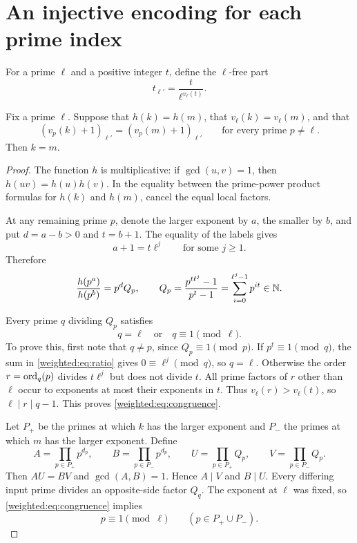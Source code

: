 \section{An injective encoding for each prime index}
For a prime $\ell$ and a positive integer $t$, define the $\ell$-free part
\[
t_{\ell'}=\frac{t}{\ell^{v_\ell(t)}}.
\]

\begin{lemma}\label{weighted:lem:encoding}
Fix a prime $\ell$. Suppose that $h(k)=h(m)$, that $v_\ell(k)=v_\ell(m)$, and that
\[
(v_p(k)+1)_{\ell'}=(v_p(m)+1)_{\ell'}
\qquad\text{for every prime }p\ne\ell.
\]
Then $k=m$.
\end{lemma}

\begin{proof}
The function $h$ is multiplicative: if $\gcd(u,v)=1$, then $h(uv)=h(u)h(v)$. In the equality between the prime-power product formulas for $h(k)$ and $h(m)$, cancel the equal local factors.

At any remaining prime $p$, denote the larger exponent by $a$, the smaller by $b$, and put $d=a-b>0$ and $t=b+1$. The equality of the labels gives
\[
a+1=t\ell^j\qquad\text{for some }j\ge1.
\]
Therefore
\begin{equation}\label{weighted:eq:ratio}
\frac{h(p^a)}{h(p^b)}=p^dQ_p,
\qquad Q_p=\frac{p^{t\ell^j}-1}{p^t-1}
=\sum_{i=0}^{\ell^j-1}p^{it}\in\mathbb N.
\end{equation}

Every prime $q$ dividing $Q_p$ satisfies
\begin{equation}\label{weighted:eq:congruence}
q=\ell\quad\text{or}\quad q\equiv1\pmod\ell.
\end{equation}
To prove this, first note that $q\ne p$, since $Q_p\equiv1\pmod p$. If $p^t\equiv1\pmod q$, the sum in \eqref{weighted:eq:ratio} gives $0\equiv\ell^j\pmod q$, so $q=\ell$. Otherwise the order $r=\operatorname{ord}_q(p)$ divides $t\ell^j$ but does not divide $t$. All prime factors of $r$ other than $\ell$ occur to exponents at most their exponents in $t$. Thus $v_\ell(r)>v_\ell(t)$, so $\ell\mid r\mid q-1$. This proves \eqref{weighted:eq:congruence}.

Let $P_+$ be the primes at which $k$ has the larger exponent and $P_-$ the primes at which $m$ has the larger exponent. Define
\[
A=\prod_{p\in P_+}p^{d_p},\qquad
B=\prod_{p\in P_-}p^{d_p},\qquad
U=\prod_{p\in P_+}Q_p,\qquad
V=\prod_{p\in P_-}Q_p.
\]
Then $AU=BV$ and $\gcd(A,B)=1$. Hence $A\mid V$ and $B\mid U$. Every differing input prime divides an opposite-side factor $Q_q$. The exponent at $\ell$ was fixed, so \eqref{weighted:eq:congruence} implies
\begin{equation}\label{weighted:eq:inputcongruence}
p\equiv1\pmod\ell\qquad(p\in P_+\cup P_-).
\end{equation}


\end{proof}
